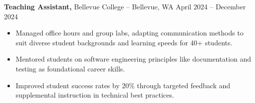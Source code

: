 \documentclass[11pt]{article}       %
\begin{document}
\textbf{Teaching Assistant,} {Bellevue College} -- Bellevue, WA \hfill April 2024 -- December 2024 \\
\vspace{-9pt}
\begin{itemize}
  \item Managed office hours and group labs, adapting communication methods to suit diverse student backgrounds and learning speeds for 40+ students.
  \item Mentored students on software engineering principles like documentation and testing as foundational career skills.
  \item Improved student success rates by 20\% through targeted feedback and supplemental instruction in technical best practices.
\end{itemize}

\end{document}

